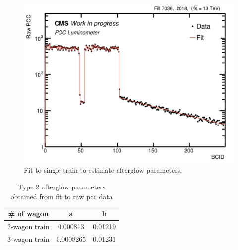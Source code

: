 \begin{figure}[!htp]
  \centering
    \includegraphics[width=\textwidth]{ashish_thesis/2018_af_fit_1.png} 
  \caption[Afterglow Effect Fit]{Fit to single train to estimate afterglow parameters.}
  \label{fig:af_fit99}
\end{figure}



\newpage
\begin{table}
  \centering
  \caption[Type 2 afterglow parameters estimation]{Type 2 afterglow parameters obtained from fit to raw pcc data}
  \begin{tabular}{ccc}
    \textbf{\# of wagon} & \textbf{a} & \textbf{b} \\
     \hline
   2-wagon train  & 0.000813 &  0.01219\\
   3-wagon train  & 0.0008265 &  0.01231\\
  \end{tabular}
  \label{fig:af_fit4000}
\end{table}

